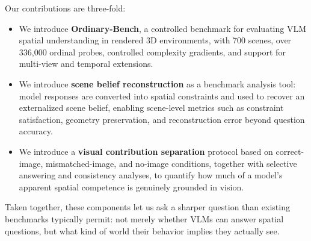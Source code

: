 Our contributions are three-fold:
\begin{itemize}
  \item We introduce \textbf{Ordinary-Bench}, a controlled benchmark for evaluating VLM spatial understanding in rendered 3D environments, with 700 scenes, over 336{,}000 ordinal probes, controlled complexity gradients, and support for multi-view and temporal extensions.
  \item We introduce \textbf{scene belief reconstruction} as a benchmark analysis tool: model responses are converted into spatial constraints and used to recover an externalized scene belief, enabling scene-level metrics such as constraint satisfaction, geometry preservation, and reconstruction error beyond question accuracy.
  \item We introduce a \textbf{visual contribution separation} protocol based on correct-image, mismatched-image, and no-image conditions, together with selective answering and consistency analyses, to quantify how much of a model's apparent spatial competence is genuinely grounded in vision.
\end{itemize}

Taken together, these components let us ask a sharper question than existing benchmarks typically permit: not merely whether VLMs can answer spatial questions, but what kind of world their behavior implies they actually see.

